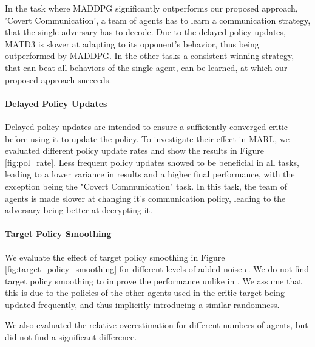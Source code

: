 \documentclass{article}
\begin{document}
In the task where \gls*{MADDPG} significantly outperforms our proposed approach, 'Covert Communication', a team of agents has to learn a communication strategy, that the single adversary has to decode.
Due to the delayed policy updates, MATD3 is slower at adapting to its opponent's behavior, thus being outperformed by MADDPG.
In the other tasks a consistent winning strategy, that can beat all behaviors of the single agent, can be learned, at which our proposed approach succeeds.
\paragraph{Delayed Policy Updates}
Delayed policy updates are intended to ensure a sufficiently converged critic before using it to update the policy.
To investigate their effect in \gls*{MARL}, we evaluated different policy update rates and show the results in Figure \ref{fig:pol_rate}.
Less frequent policy updates showed to be beneficial in all tasks, leading to a lower variance in results and a higher final performance, with the exception being the "Covert Communication" task. 
In this task, the team of agents is made slower at changing it's communication policy, leading to the adversary being better at decrypting it.
\paragraph{Target Policy Smoothing}
We evaluate the effect of target policy smoothing in Figure \ref{fig:target_policy_smoothing} for different levels of added noise $\epsilon$.
We do not find target policy smoothing to improve the performance unlike in \cite{Fujimoto2018}.
We assume that this is due to the policies of the other agents used in the critic target being updated frequently, and thus implicitly introducing a similar randomness.

We also evaluated the relative overestimation for different numbers of agents, but did not find a significant difference.
\end{document}
